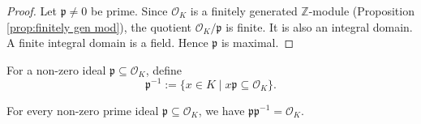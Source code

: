 \begin{proof}
Let \(\mathfrak{p} \neq 0\) be prime. Since \(\mathcal{O}_K\) is a finitely generated \(\mathbb{Z}\)-module (Proposition \ref{prop:finitely gen mod}), the quotient \(\mathcal{O}_K/\mathfrak{p}\) is finite. It is also an integral domain. A finite integral domain is a field. Hence \(\mathfrak{p}\) is maximal.
\end{proof}



\begin{defn}
For a non-zero ideal \(\mathfrak{p} \subseteq \mathcal{O}_K\), define
\[
\mathfrak{p}^{-1} := \{ x \in K \mid x \mathfrak{p} \subseteq \mathcal{O}_K \}.
\]
\end{defn}

\begin{lemma}\label{lem:inv}
For every non-zero prime ideal \(\mathfrak{p} \subseteq \mathcal{O}_K\), we have \(\mathfrak{p} \mathfrak{p}^{-1} = \mathcal{O}_K\).
\end{lemma}

